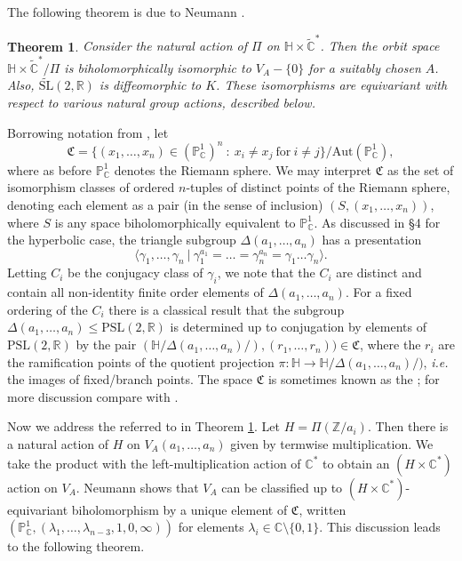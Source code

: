 \documentclass{article}
\newtheorem{theorem}{Theorem}[section]
\begin{document}
The following theorem is due to Neumann \cite{neumann_1977}.
\begin{theorem}
\label{5.1}
Consider the natural action of $\Pi$ on $\mathbb{H} \times \widetilde{\mathbb{C}}^*$. Then the orbit space $\mathbb{H} \times \widetilde{\mathbb{C}}^*/\Pi$ is biholomorphically isomorphic to $V_A - \{0\}$ for a suitably chosen $A$. Also, $\widetilde{\mathrm{SL}}(2,\mathbb{R})$ is diffeomorphic to $K$. These isomorphisms are equivariant with respect to various natural group actions, described below.
\end{theorem}

 Borrowing notation from \cite{neumann_1977}, let 
\[\mathfrak{C} = \{(x_1, \dots, x_n) \in (\mathbb{P}^1_{\mathbb{C}})^n\ :\ x_i \neq x_j \mathrm{\ for\ } i \neq j\}/\mathrm{Aut(\mathbb{P}^1_{\mathbb{C}})},\]
where as before $\mathbb{P}^1_\mathbb{C}$ denotes the Riemann sphere. We may interpret $\mathfrak{C}$ as the set of isomorphism classes of ordered $n$-tuples of distinct points of the Riemann sphere, denoting each element as a pair (in the sense of inclusion) $(S, (x_1, \dots, x_n))$, where $S$ is any space biholomorphically equivalent to $\mathbb{P}^1_\mathbb{C}$. As discussed in \S 4 for the hyperbolic case, the triangle subgroup $\Delta(a_1, \dots, a_n)$ has a presentation
\[\langle \gamma_1, \dots, \gamma_n\ |\ \gamma_1^{a_1} = \dots = \gamma_n^{a_n} = \gamma_1\dots\gamma_n \rangle.\]
Letting $C_i$ be the conjugacy class of $\gamma_i$, we note that the $C_i$ are distinct and contain all non-identity finite order elements of $\Delta(a_1, \dots, a_n)$. For a fixed ordering of the $C_i$ there is a classical result that the subgroup $\Delta(a_1, \dots, a_n) \leq \mathrm{PSL}(2, \mathbb{R})$ is determined up to conjugation by elements of $\mathrm{PSL}(2, \mathbb{R})$ by the pair $(\mathbb{H}/\Delta(a_1, \dots, a_n)/), (r_1, \dots, r_n) ) \in \mathfrak{C}$, where the $r_i$ are the ramification points of the quotient projection $\pi: \mathbb{H} \to \mathbb{H}/\Delta(a_1, \dots, a_n)/)$, \textit{i.e.} the images of fixed/branch points. The space $\mathfrak{C}$ is sometimes known as the ; for more discussion compare with \cite{neumann_1977}.

Now we address the  referred to in Theorem \ref{5.1}. Let $H = \Pi(\mathbb{Z}/a_i)$. Then there is a natural  action of $H$ on $V_A(a_1, \dots, a_n)$ given by termwise multiplication. We take the product with the left-multiplication action of $\mathbb{C}^*$ to obtain an $(H \times \mathbb{C}^*)$ action on $V_A$. Neumann shows that $V_A$ can be classified up to $(H \times \mathbb{C}^*)$-equivariant biholomorphism by a unique element of $\mathfrak{C}$, written $(\mathbb{P}_\mathbb{C}^1, (\lambda_1, \dots, \lambda_{n-3}, 1, 0, \infty))$ for elements $\lambda_i \in \mathbb{C} \setminus \{0,1\}.$ This discussion leads to the following theorem.
\end{document}
